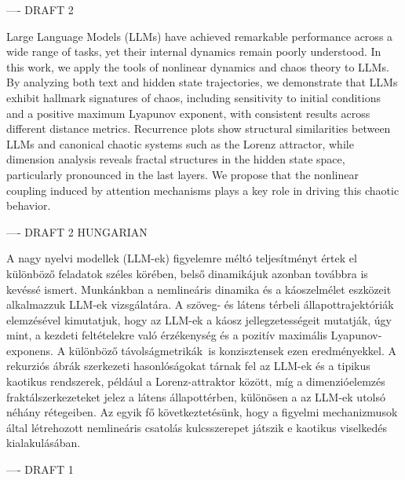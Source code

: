 ---- DRAFT 2

Large Language Models (LLMs) have achieved remarkable performance across a wide range of tasks, yet their internal dynamics remain poorly understood. In this work, we apply the tools of nonlinear dynamics and chaos theory to LLMs. By analyzing both text and hidden state trajectories, we demonstrate that LLMs exhibit hallmark signatures of chaos, including sensitivity to initial conditions and a positive maximum Lyapunov exponent, with consistent results across different distance metrics. Recurrence plots show structural similarities between LLMs and canonical chaotic systems such as the Lorenz attractor, while dimension analysis reveals fractal structures in the hidden state space, particularly pronounced in the last layers. We propose that the nonlinear coupling induced by attention mechanisms plays a key role in driving this chaotic behavior. 

---- DRAFT 2 HUNGARIAN

A nagy nyelvi modellek (LLM-ek) figyelemre méltó teljesítményt értek el különböző feladatok széles körében, belső dinamikájuk azonban továbbra is kevéssé ismert. Munkánkban a nemlineáris dinamika és a káoszelmélet eszközeit alkalmazzuk LLM-ek vizsgálatára. A szöveg- és látens térbeli állapottrajektóriák elemzésével kimutatjuk, hogy az LLM-ek a káosz jellegzetességeit mutatják, úgy mint, a kezdeti feltételekre való érzékenység és a pozitív maximális Lyapunov-exponens. A különböző távolságmetrikák is konzisztensek ezen eredményekkel. A rekurziós ábrák szerkezeti hasonlóságokat tárnak fel az LLM-ek és a tipikus kaotikus rendszerek, például a Lorenz-attraktor között, míg a dimenzióelemzés fraktálszerkezeteket jelez a látens állapottérben, különösen a az LLM-ek utolsó néhány rétegeiben. Az egyik fő következtetésünk, hogy a figyelmi mechanizmusok által létrehozott nemlineáris csatolás kulcsszerepet játszik e kaotikus viselkedés kialakulásában.

---- DRAFT 1


